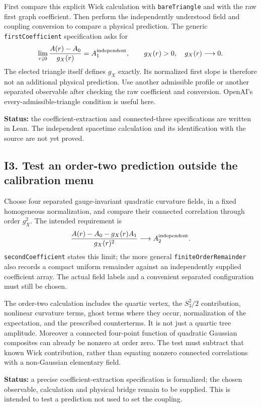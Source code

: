 \documentclass[11pt]{article}
\newcommand{\code}[1]{{\small\nolinkurl{#1}}}
\begin{document}
First compare this explicit Wick calculation with
\code{bareTriangle} and with the raw first graph coefficient.
Then perform the independently understood field and coupling
conversion to compare a physical prediction. The generic
\code{firstCoefficient} specification asks for
\[
 \lim_{r\downarrow0}\frac{A(r)-A_0}{g_X(r)}=A_1^{\rm independent},
 \qquad g_X(r)>0,\quad g_X(r)\longrightarrow0.
\]
The elected triangle itself defines $g_X$ exactly. Its normalized
first slope is therefore not an additional physical prediction.
Use another admissible profile or another separated observable
after checking the raw coefficient and conversion. OpenAI's
every-admissible-triangle condition is useful here.

\textbf{Status:} the coefficient-extraction and connected-three
specifications are written in Lean. The independent spacetime
calculation and its identification with the source are not yet proved.

\subsection{I3. Test an order-two prediction outside the calibration menu}

Choose four separated gauge-invariant quadratic curvature fields,
in a fixed homogeneous normalization, and compare their connected
correlation through order $g_X^2$. The intended requirement is
\[
 \frac{A(r)-A_0-g_X(r)A_1}{g_X(r)^2}
       \longrightarrow A_2^{\rm independent}.
\]
\code{secondCoefficient} states this limit; the more general
\code{finiteOrderRemainder} also records a compact uniform
remainder against an independently supplied coefficient array.
The actual field labels and a convenient separated configuration
must still be chosen.

The order-two calculation includes the quartic vertex, the
$S_3^2/2$ contribution, nonlinear curvature terms, ghost terms
where they occur, normalization of the expectation, and the
prescribed counterterms. It is not just a quartic tree amplitude.
Moreover a connected four-point function of quadratic Gaussian
composites can already be nonzero at order zero. The test must
subtract that known Wick contribution, rather than equating
nonzero connected correlations with a non-Gaussian elementary field.

\textbf{Status:} a precise coefficient-extraction specification is
formalized; the chosen observable, calculation and physical bridge
remain to be supplied. This is intended to test a prediction
not used to set the coupling.
\end{document}
